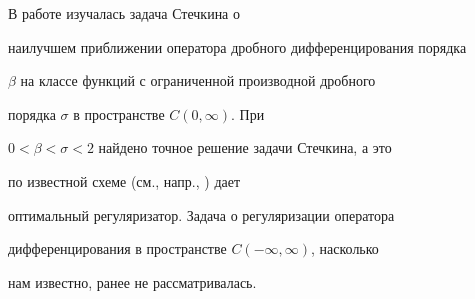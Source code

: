 \begin{notenonum}


В работе \cite{Arestov_fracderiv} изучалась задача Стечкина о


наилучшем приближении оператора дробного дифференцирования порядка


$\beta$ на классе функций с ограниченной производной дробного


порядка $\sigma$ в пространстве $C(0,\infty)$. При


$0<\beta<\sigma<2$ найдено точное решение задачи Стечкина, а это


по известной схеме (см., напр., \cite{preprint}) дает


оптимальный регуляризатор. Задача о регуляризации оператора


дифференцирования в пространстве $C(-\infty, \infty)$, насколько


нам известно, ранее не рассматривалась.


\end{notenonum}








